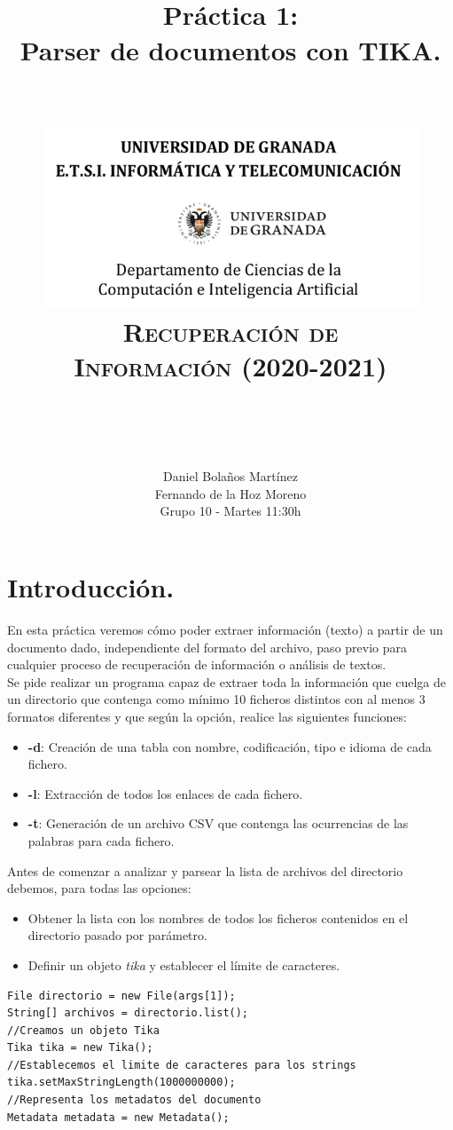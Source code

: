\documentclass[12pt]{article}
\title{
\normalfont \normalsize
\horrule{0.5pt} \\[0.4cm]
\huge Práctica 1: \\ Parser de documentos con TIKA. \\
\horrule{2pt} \\[0.5cm]
\begin{figure}[h]
\centering
\includegraphics[scale=0.75]{logoUGR.jpg}
\textsc{\textbf{Recuperación de Información (2020-2021)}} \\ [10pt]
\end{figure}\
}
\author{ Daniel Bolaños Martínez \\ Fernando de la Hoz Moreno \\ Grupo 10 - Martes 11:30h}
\date{}
\begin{document}
\maketitle

\newpage

\tableofcontents

\clearpage

\section{Introducción.}

En esta práctica veremos cómo poder extraer información (texto) a partir de un documento dado, independiente del formato del archivo, paso previo para cualquier proceso de recuperación de información o análisis de textos.\cite{Guion}\\

Se pide realizar un programa capaz de extraer toda la información que cuelga de un directorio que contenga como mínimo 10 ficheros distintos con al menos 3 formatos diferentes y que según la opción, realice las siguientes funciones:

\begin{itemize}
\item \textbf{-d}: Creación de una tabla con nombre, codificación, tipo e idioma de cada fichero.
\item \textbf{-l}: Extracción de todos los enlaces de cada fichero.
\item \textbf{-t}: Generación de un archivo CSV que contenga las ocurrencias de las palabras para cada fichero.
\end{itemize}

Antes de comenzar a analizar y parsear la lista de archivos del directorio debemos, para todas las opciones:

\begin{itemize}
\item Obtener la lista con los nombres de todos los ficheros contenidos en el directorio pasado por parámetro.
\item Definir un objeto \textit{tika} y establecer el límite de caracteres.
\end{itemize}

\begin{lstlisting}
File directorio = new File(args[1]);
String[] archivos = directorio.list();
//Creamos un objeto Tika
Tika tika = new Tika();
//Establecemos el limite de caracteres para los strings
tika.setMaxStringLength(1000000000);
//Representa los metadatos del documento
Metadata metadata = new Metadata();
\end{lstlisting}\
\end{document}
